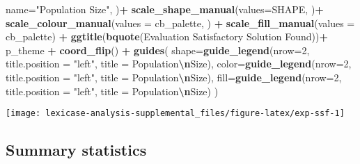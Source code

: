 \documentclass[
]{book}
\newenvironment{Shaded}{\begin{snugshade}}{\end{snugshade}}
\newcommand{\AttributeTok}[1]{\textcolor[rgb]{0.13,0.29,0.53}{#1}}
\newcommand{\DecValTok}[1]{\textcolor[rgb]{0.00,0.00,0.81}{#1}}
\newcommand{\FunctionTok}[1]{\textcolor[rgb]{0.13,0.29,0.53}{\textbf{#1}}}
\newcommand{\NormalTok}[1]{#1}
\newcommand{\SpecialCharTok}[1]{\textcolor[rgb]{0.81,0.36,0.00}{\textbf{#1}}}
\newcommand{\StringTok}[1]{\textcolor[rgb]{0.31,0.60,0.02}{#1}}
\begin{document}
\begin{Shaded}
\begin{Highlighting}[]
    \AttributeTok{name=}\StringTok{"Population Size"}\NormalTok{,}
\NormalTok{  )}\SpecialCharTok{+}
  \FunctionTok{scale\_shape\_manual}\NormalTok{(}\AttributeTok{values=}\NormalTok{SHAPE, )}\SpecialCharTok{+}
  \FunctionTok{scale\_colour\_manual}\NormalTok{(}\AttributeTok{values =}\NormalTok{ cb\_palette, ) }\SpecialCharTok{+}
  \FunctionTok{scale\_fill\_manual}\NormalTok{(}\AttributeTok{values =}\NormalTok{ cb\_palette) }\SpecialCharTok{+}
  \FunctionTok{ggtitle}\NormalTok{(}\FunctionTok{bquote}\NormalTok{(}\StringTok{\textquotesingle{}Evaluation Satisfactory Solution Found\textquotesingle{}}\NormalTok{))}\SpecialCharTok{+}
\NormalTok{  p\_theme }\SpecialCharTok{+} \FunctionTok{coord\_flip}\NormalTok{() }\SpecialCharTok{+}
  \FunctionTok{guides}\NormalTok{(}
    \AttributeTok{shape=}\FunctionTok{guide\_legend}\NormalTok{(}\AttributeTok{nrow=}\DecValTok{2}\NormalTok{, }\AttributeTok{title.position =} \StringTok{"left"}\NormalTok{, }\AttributeTok{title =} \StringTok{\textquotesingle{}Population}\SpecialCharTok{\textbackslash{}n}\StringTok{Size\textquotesingle{}}\NormalTok{),}
    \AttributeTok{color=}\FunctionTok{guide\_legend}\NormalTok{(}\AttributeTok{nrow=}\DecValTok{2}\NormalTok{, }\AttributeTok{title.position =} \StringTok{"left"}\NormalTok{, }\AttributeTok{title =} \StringTok{\textquotesingle{}Population}\SpecialCharTok{\textbackslash{}n}\StringTok{Size\textquotesingle{}}\NormalTok{),}
    \AttributeTok{fill=}\FunctionTok{guide\_legend}\NormalTok{(}\AttributeTok{nrow=}\DecValTok{2}\NormalTok{, }\AttributeTok{title.position =} \StringTok{"left"}\NormalTok{, }\AttributeTok{title =} \StringTok{\textquotesingle{}Population}\SpecialCharTok{\textbackslash{}n}\StringTok{Size\textquotesingle{}}\NormalTok{)}
\NormalTok{  )}
\end{Highlighting}
\end{Shaded}

\texttt{[image: lexicase-analysis-supplemental\_files/figure-latex/exp-ssf-1]}

\hypertarget{summary-statistics-1}{%
\subsection{Summary statistics}\label{summary-statistics-1}}
\end{document}
